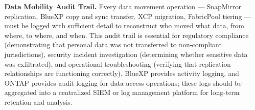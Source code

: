 \begin{securitybox}
\textbf{Data Mobility Audit Trail.}
Every data movement operation --- SnapMirror replication, BlueXP copy and sync transfer, XCP migration, FabricPool tiering --- must be logged with sufficient detail to reconstruct who moved what data, from where, to where, and when. This audit trail is essential for regulatory compliance (demonstrating that personal data was not transferred to non-compliant jurisdictions), security incident investigation (determining whether sensitive data was exfiltrated), and operational troubleshooting (verifying that replication relationships are functioning correctly). BlueXP provides activity logging, and ONTAP provides audit logging for data access operations; these logs should be aggregated into a centralized SIEM or log management platform for long-term retention and analysis.

\end{securitybox}
